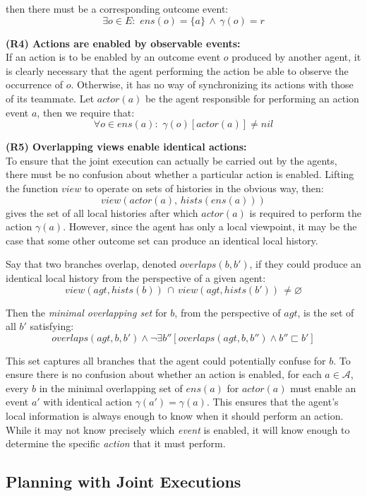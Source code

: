 then there must be a corresponding outcome event:\[
\exists o\in E:\,\, ens(o)=\{a\}\,\wedge\,\gamma(o)=r\]


\textbf{(R4) Actions are enabled by observable events:}\\
If an action is to be enabled by an outcome event $o$ produced by
another agent, it is clearly necessary that the agent performing the
action be able to observe the occurrence of $o$. Otherwise, it has
no way of synchronizing its actions with those of its teammate. Let
$actor(a)$ be the agent responsible for performing an action event
$a$, then we require that:\[
\forall o\in ens(a):\,\,\gamma(o)[actor(a)]\neq nil\]


\textbf{(R5) Overlapping views enable identical actions:}\\
To ensure that the joint execution can actually be carried out by
the agents, there must be no confusion about whether a particular
action is enabled. Lifting the function $view$ to operate on sets
of histories in the obvious way, then:\[
view(actor(a),\, hists(ens(a)))\]
 gives the set of all local histories after which $actor(a)$ is required
to perform the action $\gamma(a)$. However, since the agent has only
a local viewpoint, it may be the case that some other outcome set
can produce an identical local history.

Say that two branches overlap, denoted $overlaps(b,b')$, if they
could produce an identical local history from the perspective of a
given agent:\[
view(agt,hists(b))\,\cap\, view(agt,hists(b'))\,\neq\varnothing\]


Then the \emph{minimal overlapping set} for $b$, from the perspective
of $agt$, is the set of all $b'$ satisfying:\[
overlaps(agt,b,b')\wedge\neg\exists b''\left[overlaps(agt,b,b'')\wedge b''\sqsubset b'\right]\]


This set captures all branches that the agent could potentially confuse
for $b$. To ensure there is no confusion about whether an action
is enabled, for each $a\in\mathcal{A}$, every $b$ in the minimal
overlapping set of $ens(a)$ for $actor(a)$ must enable an event
$a'$ with identical action $\gamma(a')=\gamma(a)$. This ensures
that the agent's local information is always enough to know when it
should perform an action. While it may not know precisely which \emph{event}
is enabled, it will know enough to determine the specific \emph{action}
that it must perform.


\subsection{Planning with Joint Executions}

